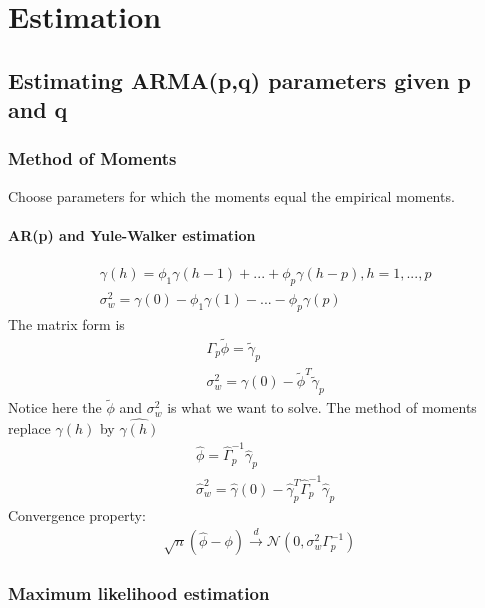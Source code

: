 \chapter{Estimation}

\section{Estimating ARMA(p,q) parameters given p and q}
\subsection{Method of Moments} 
Choose parameters for which the moments equal the empirical moments. 
\subsubsection{AR(p) and Yule-Walker estimation} 
    \begin{align*}
        & \gamma(h) = \phi_1 \gamma(h-1) + ... + \phi_p \gamma(h-p), h = 1,...,p \\
        & \sigma_w^2 = \gamma(0) - \phi_1 \gamma(1) - ... - \phi_p\gamma(p)
    \end{align*}
The matrix form is 
    \begin{align*}
        & \Gamma_p \tilde{\phi} = \tilde{\gamma}_p\\
        & \sigma_w^2 = \gamma(0) - \tilde{\phi}^T \tilde{\gamma}_p
    \end{align*}
Notice here the $\tilde{\phi}$ and $\sigma_w^2$ is what we want to solve. The method of moments replace $\gamma(h)$ by $\hat{\gamma(h)}$
    \begin{align*}
        & \hat{\phi} = \hat{\Gamma}_p^{-1} \hat{\gamma}_p \\
        & \hat{\sigma}_w^2 = \hat{\gamma}(0) - \hat{\gamma}_p^T \hat{\Gamma}_p^{-1}\hat{\gamma}_p
    \end{align*}
Convergence property: 
    \begin{align*}
        \sqrt{n}(\hat{\phi} - \phi) \overset{d}{\to} \mathcal{N}(0, \sigma_w^2 \Gamma_p^{-1})
    \end{align*}



\subsection{Maximum likelihood estimation} 
